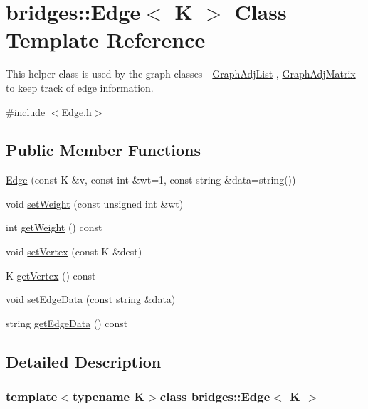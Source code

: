 \hypertarget{classbridges_1_1_edge}{}\section{bridges\+:\+:Edge$<$ K $>$ Class Template Reference}
\label{classbridges_1_1_edge}


This helper class is used by the graph classes -\/ \hyperlink{classbridges_1_1_graph_adj_list}{Graph\+Adj\+List} , \hyperlink{classbridges_1_1_graph_adj_matrix}{Graph\+Adj\+Matrix} -\/ to keep track of edge information.  




{\ttfamily \#include $<$Edge.\+h$>$}

\subsection*{Public Member Functions}
\begin{DoxyCompactItemize}
\item 
\hyperlink{classbridges_1_1_edge_a5c574e9dc244ddbf50edbeabc4564061}{Edge} (const K \&v, const int \&wt=1, const string \&data=string())
\item 
void \hyperlink{classbridges_1_1_edge_ad087fc6e5f669102a15147cb6b9c1025}{set\+Weight} (const unsigned int \&wt)
\item 
int \hyperlink{classbridges_1_1_edge_acd6516bea44a9da4fe8c5a0e0d989db4}{get\+Weight} () const 
\item 
void \hyperlink{classbridges_1_1_edge_ad34446f673287f3291a0c68efd3613e7}{set\+Vertex} (const K \&dest)
\item 
K \hyperlink{classbridges_1_1_edge_a43b4b038e9477f79b10e8ca6f0b96215}{get\+Vertex} () const 
\item 
void \hyperlink{classbridges_1_1_edge_a4521143efeb4621df1ac9017dbc3461d}{set\+Edge\+Data} (const string \&data)
\item 
string \hyperlink{classbridges_1_1_edge_ae91e132ff2b3eb6181fb2f263e8a0ed5}{get\+Edge\+Data} () const 
\end{DoxyCompactItemize}


\subsection{Detailed Description}
\subsubsection*{template$<$typename K$>$class bridges\+::\+Edge$<$ K $>$}

